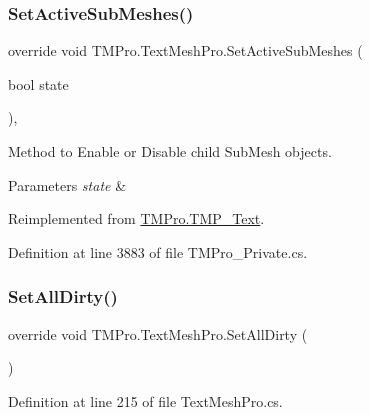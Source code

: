 \subsubsection{\texorpdfstring{SetActiveSubMeshes()}{SetActiveSubMeshes()}}
{\footnotesize\ttfamily override void T\+M\+Pro.\+Text\+Mesh\+Pro.\+Set\+Active\+Sub\+Meshes (\begin{DoxyParamCaption}\item[{bool}]{state }\end{DoxyParamCaption})\hspace{0.3cm}{\ttfamily [protected]}, {\ttfamily [virtual]}}



Method to Enable or Disable child Sub\+Mesh objects. 


\begin{DoxyParams}{Parameters}
{\em state} & \\
\hline
\end{DoxyParams}


Reimplemented from \mbox{\hyperlink{class_t_m_pro_1_1_t_m_p___text_a83493a2f045f78defb9e86c92d1b3792}{T\+M\+Pro.\+T\+M\+P\+\_\+\+Text}}.



Definition at line 3883 of file T\+M\+Pro\+\_\+\+Private.\+cs.

\mbox{\label{class_t_m_pro_1_1_text_mesh_pro_a28274571ae3e165a5db057949ae2f3ea}} 
\subsubsection{\texorpdfstring{SetAllDirty()}{SetAllDirty()}}
{\footnotesize\ttfamily override void T\+M\+Pro.\+Text\+Mesh\+Pro.\+Set\+All\+Dirty (\begin{DoxyParamCaption}{ }\end{DoxyParamCaption})}







Definition at line 215 of file Text\+Mesh\+Pro.\+cs.

\mbox{\label{class_t_m_pro_1_1_text_mesh_pro_a1fcd15c0e6dab2ae7d3cb013d1bdc3c3}} 
